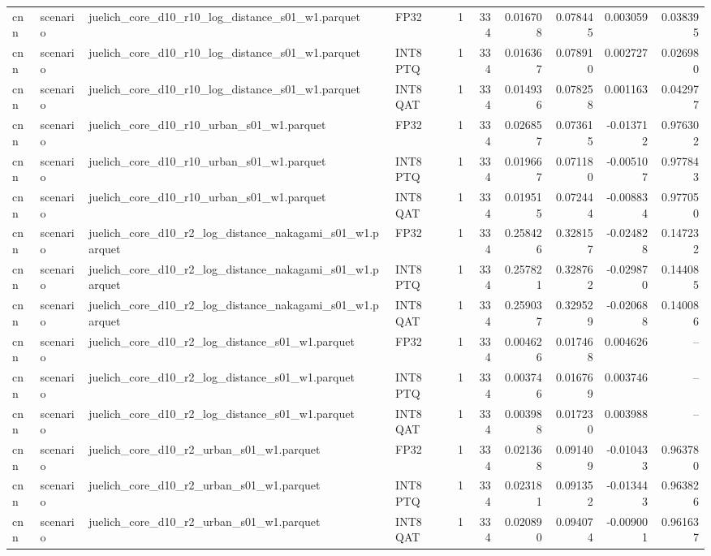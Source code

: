 \begin{tabular}{llllrrrrrr}
cnn & scenario & juelich\_core\_d10\_r10\_log\_distance\_s01\_w1.parquet & FP32 & 1 & 334 & 0.016708 & 0.078445 & 0.003059 & 0.038395 \\
cnn & scenario & juelich\_core\_d10\_r10\_log\_distance\_s01\_w1.parquet & INT8 PTQ & 1 & 334 & 0.016367 & 0.078910 & 0.002727 & 0.026980 \\
cnn & scenario & juelich\_core\_d10\_r10\_log\_distance\_s01\_w1.parquet & INT8 QAT & 1 & 334 & 0.014936 & 0.078258 & 0.001163 & 0.042977 \\
cnn & scenario & juelich\_core\_d10\_r10\_urban\_s01\_w1.parquet & FP32 & 1 & 334 & 0.026857 & 0.073615 & -0.013712 & 0.976302 \\
cnn & scenario & juelich\_core\_d10\_r10\_urban\_s01\_w1.parquet & INT8 PTQ & 1 & 334 & 0.019667 & 0.071180 & -0.005107 & 0.977843 \\
cnn & scenario & juelich\_core\_d10\_r10\_urban\_s01\_w1.parquet & INT8 QAT & 1 & 334 & 0.019515 & 0.072444 & -0.008834 & 0.977050 \\
cnn & scenario & juelich\_core\_d10\_r2\_log\_distance\_nakagami\_s01\_w1.parquet & FP32 & 1 & 334 & 0.258426 & 0.328157 & -0.024828 & 0.147232 \\
cnn & scenario & juelich\_core\_d10\_r2\_log\_distance\_nakagami\_s01\_w1.parquet & INT8 PTQ & 1 & 334 & 0.257821 & 0.328762 & -0.029870 & 0.144085 \\
cnn & scenario & juelich\_core\_d10\_r2\_log\_distance\_nakagami\_s01\_w1.parquet & INT8 QAT & 1 & 334 & 0.259037 & 0.329529 & -0.020688 & 0.140086 \\
cnn & scenario & juelich\_core\_d10\_r2\_log\_distance\_s01\_w1.parquet & FP32 & 1 & 334 & 0.004626 & 0.017468 & 0.004626 & -- \\
cnn & scenario & juelich\_core\_d10\_r2\_log\_distance\_s01\_w1.parquet & INT8 PTQ & 1 & 334 & 0.003746 & 0.016769 & 0.003746 & -- \\
cnn & scenario & juelich\_core\_d10\_r2\_log\_distance\_s01\_w1.parquet & INT8 QAT & 1 & 334 & 0.003988 & 0.017230 & 0.003988 & -- \\
cnn & scenario & juelich\_core\_d10\_r2\_urban\_s01\_w1.parquet & FP32 & 1 & 334 & 0.021368 & 0.091409 & -0.010433 & 0.963780 \\
cnn & scenario & juelich\_core\_d10\_r2\_urban\_s01\_w1.parquet & INT8 PTQ & 1 & 334 & 0.023181 & 0.091352 & -0.013443 & 0.963826 \\
cnn & scenario & juelich\_core\_d10\_r2\_urban\_s01\_w1.parquet & INT8 QAT & 1 & 334 & 0.020890 & 0.094074 & -0.009001 & 0.961637 \\

\end{tabular}
